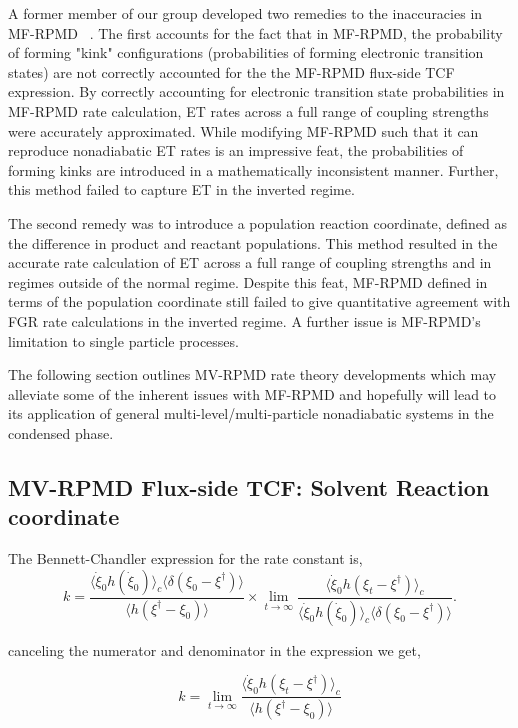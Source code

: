 \documentclass[phd,tocprelim]{cornell}
\begin{document}
A former member of our group developed two remedies to the inaccuracies in MF-RPMD ~\cite{JD2016}. The first accounts for the fact that in MF-RPMD, the probability of forming "kink" configurations (probabilities of forming electronic transition states) are not correctly accounted for the the MF-RPMD flux-side TCF expression. By correctly accounting for electronic transition state probabilities in MF-RPMD rate calculation, ET rates across a full range of coupling strengths were accurately approximated. While modifying MF-RPMD such that it can reproduce nonadiabatic ET rates is an impressive feat, the probabilities of forming kinks are introduced in a mathematically inconsistent manner. Further, this method failed to capture ET in the inverted regime. 

The second remedy was to introduce a population reaction coordinate, defined as the difference in product and reactant populations. This method resulted in the accurate rate calculation of ET across a full range of coupling strengths and in regimes outside of the normal regime. Despite this feat, MF-RPMD defined in terms of the population coordinate still failed to give quantitative agreement with FGR rate calculations in the inverted regime. A further issue is MF-RPMD's limitation to single particle processes. 

The following section outlines MV-RPMD rate theory developments which may alleviate some of the inherent issues with MF-RPMD and hopefully will lead to its application of general multi-level/multi-particle nonadiabatic systems in the condensed phase. 

 \subsection{MV-RPMD Flux-side TCF: Solvent Reaction coordinate}
The Bennett-Chandler expression for the rate constant is,
\begin{equation}
k= \frac{\langle \dot{\xi}_0  h(\dot{\xi}_0) \rangle_c \langle \delta (\xi_0 -\xi^{\dagger})\rangle}{\langle h(\xi^{\dagger} -\xi_0)\rangle} \times \lim_{t \to \infty} \frac{\langle \dot{\xi}_0 h(\xi_t -\xi^{\dagger}) \rangle_c}{\langle \dot{\xi}_0  h(\dot{\xi}_0) \rangle_c \langle \delta (\xi_0 -\xi^{\dagger})\rangle}.
\end{equation}

canceling the numerator and denominator in the expression we get, 

\begin{equation}
k= \lim_{t \to \infty}\frac{\langle \dot{\xi}_0 h(\xi_t -\xi^{\dagger}) \rangle_c}{\langle h(\xi^{\dagger} -\xi_0)\rangle} 
\end{equation}
\end{document}
